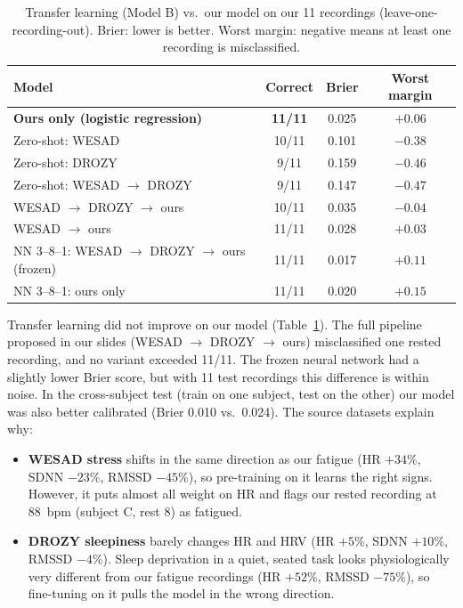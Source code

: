 \documentclass[11pt]{article}
\newcommand{\rowband}{\rowcolors{2}{bblight}{white}}
\begin{document}
\begin{table}[h]
\centering
\caption{Transfer learning (Model B) vs.\ our model on our 11 recordings (leave-one-recording-out).
Brier: lower is better. Worst margin: negative means at least one recording is misclassified.}
\label{tab:modelb}
\rowband\begin{tabular}{lccc}
\toprule
Model & Correct & Brier & Worst margin \\
\midrule
\textbf{Ours only (logistic regression)}        & \textbf{11/11} & 0.025 & $+0.06$ \\
Zero-shot: WESAD                                 & 10/11 & 0.101 & $-0.38$ \\
Zero-shot: DROZY                                 & 9/11  & 0.159 & $-0.46$ \\
Zero-shot: WESAD $\rightarrow$ DROZY             & 9/11  & 0.147 & $-0.47$ \\
WESAD $\rightarrow$ DROZY $\rightarrow$ ours     & 10/11 & 0.035 & $-0.04$ \\
WESAD $\rightarrow$ ours                         & 11/11 & 0.028 & $+0.03$ \\
NN 3--8--1: WESAD $\rightarrow$ DROZY $\rightarrow$ ours (frozen) & 11/11 & 0.017 & $+0.11$ \\
NN 3--8--1: ours only                            & 11/11 & 0.020 & $+0.15$ \\
\bottomrule
\end{tabular}
\end{table}

Transfer learning did not improve on our model (Table~\ref{tab:modelb}). The full pipeline proposed in our
slides (WESAD $\rightarrow$ DROZY $\rightarrow$ ours) misclassified one rested recording, and no variant
exceeded 11/11. The frozen neural network had a slightly lower Brier score, but with 11 test recordings
this difference is within noise. In the cross-subject test (train on one subject, test on the other) our
model was also better calibrated (Brier 0.010 vs.\ 0.024). The source datasets explain why:
\begin{itemize}
  \item \textbf{WESAD stress} shifts in the same direction as our fatigue (HR $+34\%$, SDNN $-23\%$,
  RMSSD $-45\%$), so pre-training on it learns the right signs. However, it puts almost all weight on HR
  and flags our rested recording at 88~bpm (subject C, rest 8) as fatigued.
  \item \textbf{DROZY sleepiness} barely changes HR and HRV (HR $+5\%$, SDNN $+10\%$, RMSSD $-4\%$). Sleep
  deprivation in a quiet, seated task looks physiologically very different from our fatigue recordings
  (HR $+52\%$, RMSSD $-75\%$), so fine-tuning on it pulls the model in the wrong direction.
\end{itemize}
\end{document}
